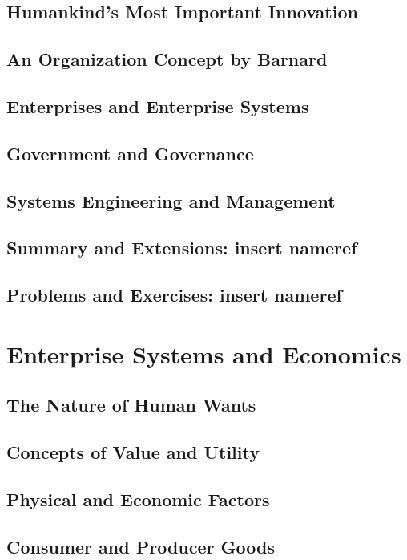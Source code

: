 \documentclass[11pt,fleqn]{book} %
\newcommand{\problems}[1]{} %
\begin{document}
    \section{Humankind's Most Important Innovation}
    \section{An Organization Concept by Barnard}
    \section{Enterprises and Enterprise Systems}
    \section{Government and Governance}
    \section{Systems Engineering and Management}
    \section{Summary and Extensions: insert nameref}
    \section{Problems and Exercises: insert nameref}
      \problems{03}
  
  \chapter{Enterprise Systems and Economics}
    \section{The Nature of Human Wants}
    \section{Concepts of Value and Utility}
    \section{Physical and Economic Factors}
    \section{Consumer and Producer Goods}
\end{document}
